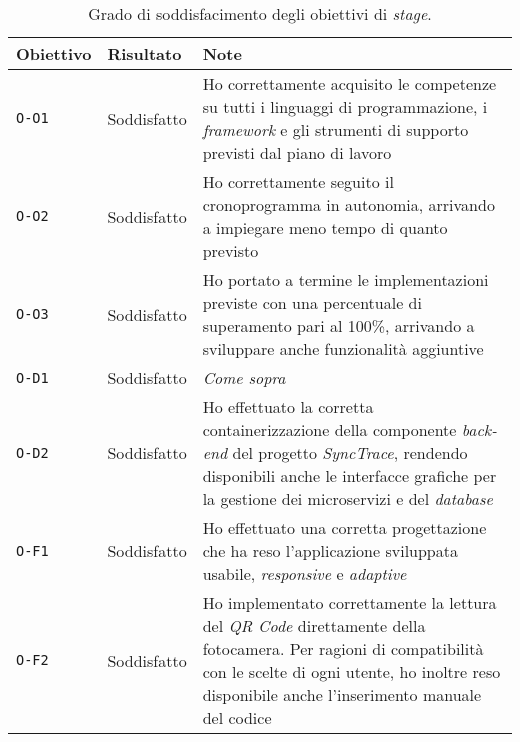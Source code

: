 \begin{table}[h]
  \label{tab:grado-soddisfacimento}
  \begin{center}
\begin{tabular}{llp{8cm}}
\textbf{Obiettivo}         & \textbf{Risultato}               & \textbf{Note}            \\ \hline
\multicolumn{1}{|l|}{\texttt{O-O1}} & \multicolumn{1}{l|}{Soddisfatto} & \multicolumn{1}{p{8cm}|}{Ho correttamente acquisito le competenze su tutti i linguaggi di programmazione, i \textit{framework} e gli strumenti di supporto previsti dal piano di lavoro} \\ \hline
\multicolumn{1}{|l|}{\texttt{O-O2}} & \multicolumn{1}{l|}{Soddisfatto} & \multicolumn{1}{p{8cm}|}{Ho correttamente seguito il cronoprogramma in autonomia, arrivando a impiegare meno tempo di quanto previsto} \\ \hline
\multicolumn{1}{|l|}{\texttt{O-O3}} & \multicolumn{1}{l|}{Soddisfatto} & \multicolumn{1}{p{8cm}|}{Ho portato a termine le implementazioni previste con una percentuale di superamento pari al 100\%, arrivando a sviluppare anche funzionalità aggiuntive} \\ \hline
\multicolumn{1}{|l|}{\texttt{O-D1}} & \multicolumn{1}{l|}{Soddisfatto} & \multicolumn{1}{p{8cm}|}{\textit{Come sopra}} \\ \hline
\multicolumn{1}{|l|}{\texttt{O-D2}} & \multicolumn{1}{l|}{Soddisfatto} & \multicolumn{1}{p{8cm}|}{Ho effettuato la corretta containerizzazione della componente \textit{back-end} del progetto \textit{SyncTrace}, rendendo disponibili anche le interfacce grafiche per la gestione dei microservizi e del \textit{database}} \\ \hline
\multicolumn{1}{|l|}{\texttt{O-F1}} & \multicolumn{1}{l|}{Soddisfatto} & \multicolumn{1}{p{8cm}|}{Ho effettuato una corretta progettazione che ha reso l'applicazione sviluppata usabile, \textit{responsive} e \textit{adaptive}} \\ \hline
\multicolumn{1}{|l|}{\texttt{O-F2}} & \multicolumn{1}{l|}{Soddisfatto} & \multicolumn{1}{p{8cm}|}{Ho implementato correttamente la lettura del \textit{QR Code} direttamente della fotocamera. Per ragioni di compatibilità con le scelte di ogni utente, ho inoltre reso disponibile anche l'inserimento manuale del codice} \\ \hline
\end{tabular}
\end{center}
\caption{Grado di soddisfacimento degli obiettivi di \textit{stage}.}
\end{table}


